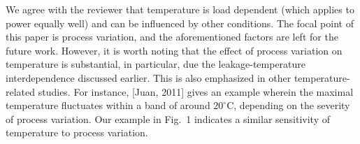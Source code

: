 \begin{authors}
We agree with the reviewer that temperature is load dependent (which applies to power equally well) and can be influenced by other conditions.
The focal point of this paper is process variation, and the aforementioned factors are left for the future work.
However, it is worth noting that the effect of process variation on temperature is substantial, in particular, due the leakage-temperature interdependence discussed earlier.
This is also emphasized in other temperature-related studies.
For instance, [Juan, 2011] gives an example wherein the maximal temperature fluctuates within a band of around $20^\circ$C, depending on the severity of process variation.
Our example in Fig.~1 indicates a similar sensitivity of temperature to process variation.

\begin{actions}
\end{actions}
\end{authors}

